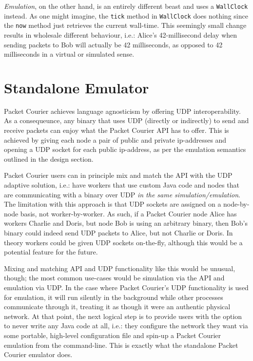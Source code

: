 \emph{Emulation}, on the other hand, is an entirely different beast and uses a \texttt{WallClock} instead. As one
might imagine, the \texttt{tick} method in \texttt{WallClock} does nothing since the \texttt{now} method just
retrieves the current wall-time. This seemingly small change results in wholesale different behaviour, i.e.: Alice's
42-millisecond delay when sending packets to Bob will actually be 42 milliseconds, as opposed to 42 milliseconds in a
virtual or simulated sense.


\section{Standalone Emulator}

Packet Courier achieves language agnosticism by offering UDP interoperability. As a consequeunce, any binary that
uses UDP (directly or indirectly) to send and receive packets can enjoy what the Packet Courier API has to offer.
This is achieved by giving each node a pair of public and private ip-addresses and opening a UDP socket for each
public ip-address, as per the emulation semantics outlined in the design section.

Packet Courier users can in principle mix and match the API with the UDP adaptive solution, i.e.: have workers that
use custom Java code and nodes that are communicating with a binary over UDP \emph{in the same simulation/emulation}.
The limitation with this approach is that UDP sockets are assigned on a node-by-node basis, not worker-by-worker. As
such, if a Packet Courier node Alice has workers Charlie and Doris, but node Bob is using an arbitrary binary, then
Bob's binary could indeed send UDP packets to Alice, but not Charlie or Doris. In theory workers could be given UDP
sockets on-the-fly, although this would be a potential feature for the future.

Mixing and matching API and UDP functionality like this would be unusual, though; the most common use-cases would be
simulation via the API and emulation via UDP. In the case where Packet Courier's UDP functionality is used for
emulation, it will run silently in the background while other processes communicate through it, treating it as though
it were an authentic physical network. At that point, the next logical step is to provide users with the option to
never write any Java code at all, i.e.: they configure the network they want via some portable, high-level
configuration file and spin-up a Packet Courier emulation from the command-line. This is exactly what the standalone
Packet Courier emulator does.

